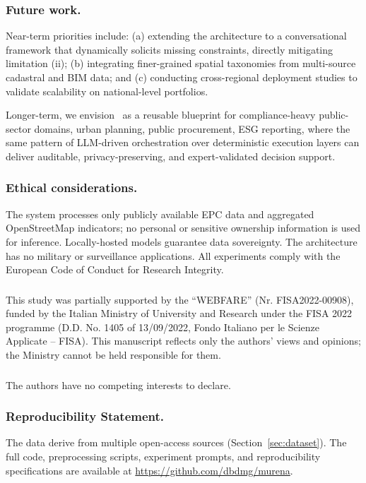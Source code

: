 \documentclass[runningheads,orivec]{llncs}
\newcommand{\code}{\url{https://github.com/dbdmg/murena}}
\begin{document}
\subsubsection{Future work.}
Near-term priorities include: 
(a) extending the architecture to a conversational framework that dynamically solicits missing constraints, directly mitigating limitation (ii); 
(b) integrating finer-grained spatial taxonomies from multi-source cadastral and BIM data; and (c) conducting cross-regional deployment studies to validate scalability on national-level portfolios.

Longer-term, we envision \methodACR\  as a reusable blueprint for compliance-heavy public-sector domains, urban planning, public procurement, ESG reporting, where the same pattern of LLM-driven orchestration over deterministic execution layers can deliver auditable, privacy-preserving, and expert-validated decision support.

\begin{credits}

    \subsubsection{Ethical considerations.}
    The system processes only publicly available EPC data and aggregated OpenStreetMap indicators; no personal or sensitive ownership information is used for inference. Locally-hosted models guarantee data sovereignty. The architecture has no military or surveillance applications. All experiments comply with the European Code of Conduct for Research Integrity.
    
    \subsubsection{\ackname}
    This study was partially supported by the ``WEBFARE'' (Nr. FISA2022-00908), funded by the Italian Ministry of University and Research under the FISA 2022 programme (D.D. No. 1405 of 13/09/2022, Fondo Italiano per le Scienze Applicate – FISA). This manuscript reflects only the authors’ views and opinions; the Ministry cannot be held responsible for them.
    
    \subsubsection{\discintname}
    The authors have no competing interests to declare.
    
    \subsubsection{Reproducibility Statement.}
    The data derive from multiple open-access sources (Section~\ref{sec:dataset}). 
    The full code, preprocessing scripts, experiment prompts, and reproducibility specifications are available at \code.

\end{credits}



\end{document}
